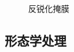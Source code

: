 \documentclass[11pt]{ctexart}
\begin{document}
\begin{figure}[htbp]
{\begin{minipage}[t]{0.4\linewidth}
        \end{minipage}
        }
        \centering
        \caption{反锐化掩膜}\label{fig:digit}
  \end{figure}

\newpage

\subsection* {形态学处理}
\end{document}
